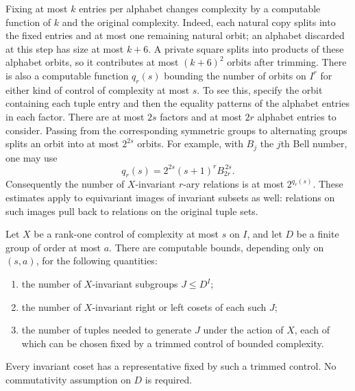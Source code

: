 Fixing at most $k$ entries per alphabet changes complexity by a computable
function of $k$ and the original complexity.  Indeed, each natural copy
splits into the fixed entries and at most one remaining natural orbit;
an alphabet discarded at this step has size at most $k+6$.
A private square splits into products of these alphabet orbits, so it
contributes at most $(k+6)^2$ orbits after trimming.
There is also a computable function $q_r(s)$ bounding the number of
orbits on $I^r$ for either kind of control of complexity at most $s$.
To see this, specify the orbit containing each tuple entry and then the
equality patterns of the alphabet entries in each factor.  There are at
most $2s$ factors and at most $2r$ alphabet entries to consider.
Passing from the corresponding symmetric groups to alternating groups
splits an orbit into at most $2^{2s}$ orbits.  For example, with $B_j$ the
$j$th Bell number, one may use
\begin{equation}\label{n:tuple-bound}
 q_r(s)=2^{2s}(s+1)^r B_{2r}^{\,2s}.
\end{equation}
Consequently the number of $X$-invariant $r$-ary relations is at most
$2^{q_r(s)}$.  These estimates apply to equivariant images of invariant
subsets as well: relations on such images pull back to relations on the
original tuple sets.

\begin{lemma}\label{n:compression}
Let $X$ be a rank-one control of complexity at most $s$ on $I$, and let
$D$ be a finite group of order at most $a$.  There are computable bounds,
depending only on $(s,a)$, for the following quantities:
\begin{enumerate}[label=\textup{(\roman*)}]
\item the number of $X$-invariant subgroups $J\le D^I$;
\item the number of $X$-invariant right or left cosets of each such $J$;
\item the number of tuples needed to generate $J$ under the action of
      $X$, each of which can be chosen fixed by a trimmed control of
      bounded complexity.
\end{enumerate}
Every invariant coset has a representative fixed by such a trimmed
control.  No commutativity assumption on $D$ is required.
\end{lemma}

